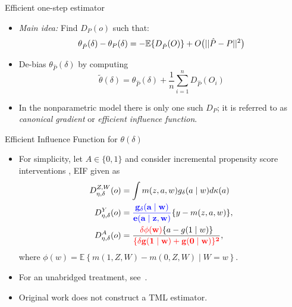 \documentclass{beamer}
\begin{document}

\begin{frame}{Efficient one-step estimator}
  \begin{itemize}
  \item \textit{Main idea:} Find $D_P(o)$ such that:
    \[\theta_{\hat P}(\delta) - \theta_P(\delta) = -\mathbb{E}\{ D_{\hat
        P}(O)\} + O\big(||\hat P - P||^2\big)\]
  \item De-bias $\theta_{\hat P}(\delta)$ by computing
    \[\tilde \theta(\delta) = \theta_{\hat P}(\delta) +
      \frac{1}{n}\sum_{i=1}^n D_{\hat P}(O_i)\]
  \item In the nonparametric model there is only one such $D_P$; it
    is referred to as \textit{canonical gradient} or \textit{efficient
      influence function}.
  \end{itemize}

\note{
}

\end{frame}


\begin{frame}[c]{Efficient Influence Function for $\theta(\delta)$}

\begin{center}
\begin{itemize}
\itemsep2pt
\item For simplicity, let $A \in \{0, 1\}$ and consider incremental propensity
  score interventions \citep{kennedy2017nonparametric}, EIF given as
  \vspace{-0.5em}
  \begin{align*}
    D^{Z, W}_{\eta, \delta}(o) &= \int m(z, a, w) g_{\delta}(a \mid w)
      d\kappa(a)\\
    D^Y_{\eta, \delta}(o) &= \mathbf{\textcolor{blue}{\frac{g_{\delta}
    (a \mid w)} {e(a \mid z, w)}}} \{y - m(z,a,w) \},\\
    D^A_{\eta,\delta}(o) &= \frac{\mathbf{\textcolor{red}{\delta\phi(w)}}\{a -
      g(1 \mid w)\}}{\mathbf{\textcolor{red}{\{\delta g(1 \mid w) +
      g(0 \mid w)\}^2}}},
  \end{align*}
  where $\phi(w) = \mathbb{E}\left\{m(1, Z, W) - m(0, Z, W) \mid W = w
  \right\}$.
\item For an unabridged treatment, see~\cite{diaz2020causal}.
\item Original work does not construct a TML estimator.
\end{itemize}
\end{center}

\note{
}

\end{frame}
\end{document}
